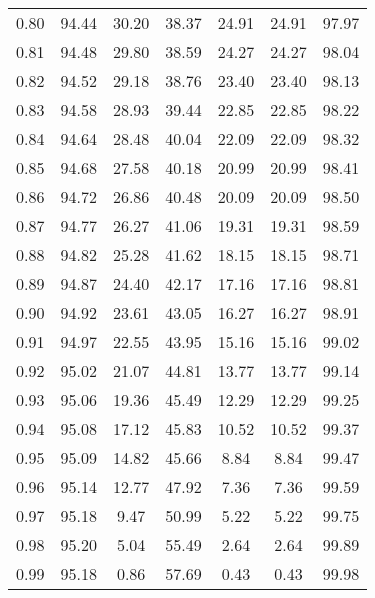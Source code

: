 \begin{tabular}{|c|c|c|c|c|c|c|}
      0.80 &     94.44 &     30.20 &      38.37 &   24.91 &      24.91 &         97.97 \\
      0.81 &     94.48 &     29.80 &      38.59 &   24.27 &      24.27 &         98.04 \\
      0.82 &     94.52 &     29.18 &      38.76 &   23.40 &      23.40 &         98.13 \\
      0.83 &     94.58 &     28.93 &      39.44 &   22.85 &      22.85 &         98.22 \\
      0.84 &     94.64 &     28.48 &      40.04 &   22.09 &      22.09 &         98.32 \\
      0.85 &     94.68 &     27.58 &      40.18 &   20.99 &      20.99 &         98.41 \\
      0.86 &     94.72 &     26.86 &      40.48 &   20.09 &      20.09 &         98.50 \\
      0.87 &     94.77 &     26.27 &      41.06 &   19.31 &      19.31 &         98.59 \\
      0.88 &     94.82 &     25.28 &      41.62 &   18.15 &      18.15 &         98.71 \\
      0.89 &     94.87 &     24.40 &      42.17 &   17.16 &      17.16 &         98.81 \\
      0.90 &     94.92 &     23.61 &      43.05 &   16.27 &      16.27 &         98.91 \\
      0.91 &     94.97 &     22.55 &      43.95 &   15.16 &      15.16 &         99.02 \\
      0.92 &     95.02 &     21.07 &      44.81 &   13.77 &      13.77 &         99.14 \\
      0.93 &     95.06 &     19.36 &      45.49 &   12.29 &      12.29 &         99.25 \\
      0.94 &     95.08 &     17.12 &      45.83 &   10.52 &      10.52 &         99.37 \\
      0.95 &     95.09 &     14.82 &      45.66 &    8.84 &       8.84 &         99.47 \\
      0.96 &     95.14 &     12.77 &      47.92 &    7.36 &       7.36 &         99.59 \\
      0.97 &     95.18 &      9.47 &      50.99 &    5.22 &       5.22 &         99.75 \\
      0.98 &     95.20 &      5.04 &      55.49 &    2.64 &       2.64 &         99.89 \\
      0.99 &     95.18 &      0.86 &      57.69 &    0.43 &       0.43 &         99.98 \\
\bottomrule
\end{tabular}
